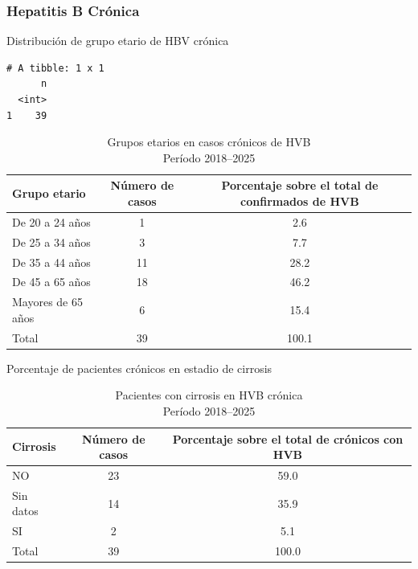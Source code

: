 \documentclass[
  letterpaper,
  DIV=11,
  numbers=noendperiod]{scrartcl}
\begin{document}
\hypertarget{hepatitis-b-cruxf3nica}{%
\subsubsection{\texorpdfstring{\textbf{Hepatitis B
Crónica}}{Hepatitis B Crónica}}\label{hepatitis-b-cruxf3nica}}

Distribución de grupo etario de HBV crónica

\begin{verbatim}
# A tibble: 1 x 1
      n
  <int>
1    39
\end{verbatim}

\begin{table}
\caption*{
{\fontsize{20}{25}\selectfont  Grupos etarios en casos crónicos de HVB\fontsize{12}{15}\selectfont } \\ 
{\fontsize{14}{17}\selectfont  Período 2018–2025\fontsize{12}{15}\selectfont }
} 
\fontsize{12.0pt}{14.0pt}\selectfont
\begin{tabular*}{\linewidth}{@{\extracolsep{\fill}}lcc}
\toprule
Grupo etario  & Número de casos & Porcentaje sobre el total de confirmados de HVB \\ 
\midrule\addlinespace[2.5pt]
De 20 a 24 años & 1 & 2.6 \\ 
De 25 a 34 años & 3 & 7.7 \\ 
De 35 a 44 años & 11 & 28.2 \\ 
De 45 a 65 años & 18 & 46.2 \\ 
Mayores de 65 años & 6 & 15.4 \\ 
Total & 39 & 100.1 \\ 
\bottomrule
\end{tabular*}
\end{table}

Porcentaje de pacientes crónicos en estadio de cirrosis

\begin{table}
\caption*{
{\fontsize{20}{25}\selectfont  Pacientes con cirrosis en HVB crónica\fontsize{12}{15}\selectfont } \\ 
{\fontsize{14}{17}\selectfont  Período 2018–2025\fontsize{12}{15}\selectfont }
} 
\fontsize{12.0pt}{14.0pt}\selectfont
\begin{tabular*}{\linewidth}{@{\extracolsep{\fill}}lcc}
\toprule
Cirrosis  & Número de casos & Porcentaje sobre el total de crónicos con HVB \\ 
\midrule\addlinespace[2.5pt]
NO & 23 & 59.0 \\ 
Sin datos & 14 & 35.9 \\ 
SI & 2 & 5.1 \\ 
Total & 39 & 100.0 \\ 
\bottomrule
\end{tabular*}
\end{table}
\end{document}
